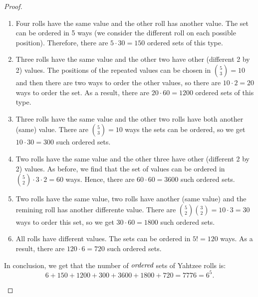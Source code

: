 \begin{proof}
\begin{enumerate}[(a)]
\begin{enumerate}[(1)]
            \item Four rolls have the same value and the other roll has another value.
                The set can be ordered in 5 ways (we consider the different roll on each
                possible position). Therefore, there are $5 \cdot 30 = 150$ ordered sets of this type.

            \item Three rolls have the same value and the other two have other (different 2 by 2) values.
                The positions of the repeated values can be chosen in $\binom{5}{3} = 10$ and then there 
                are two ways to order the other values, so there are $10 \cdot 2 = 20$ ways to order the set.
                As a result, there are $20 \cdot 60 = 1200$ ordered sets of this type.

            \item Three rolls have the same value and the other two rolls have both another (same) value.
                There are $\binom{5}{3} = 10$ ways the sets can be ordered, so we get $10 \cdot 30 = 300$
                such ordered sets.

            \item Two rolls have the same value and the other three have other (different 2 by 2) values.
                As before, we find that the set of values can be ordered in 
                $\binom{5}{2} \cdot 3 \cdot 2 = 60$ ways.
                Hence, there are $60 \cdot 60 = 3600$ such ordered sets.

            \item Two rolls have the same value, two rolls have another (same value) and the 
                remining roll has another differente value. There are 
                $\binom{5}{2}\binom{3}{2} = 10 \cdot 3 = 30$ ways to order this set, so we get 
                $30 \cdot 60 = 1800$ such ordered sets.

            \item All rolls have different values. The sets can be ordered in $5! = 120$ ways. As a result,
                there are $120 \cdot 6 = 720$ such ordered sets.
        \end{enumerate}

        In conclusion, we get that the number of $\emph{ordered}$ sets of Yahtzee rolls is:
         \[
            6 + 150 + 1200 + 300 + 3600 + 1800 + 720 = 7776 = 6^5
        .\] 
    \end{enumerate}
\end{proof}


